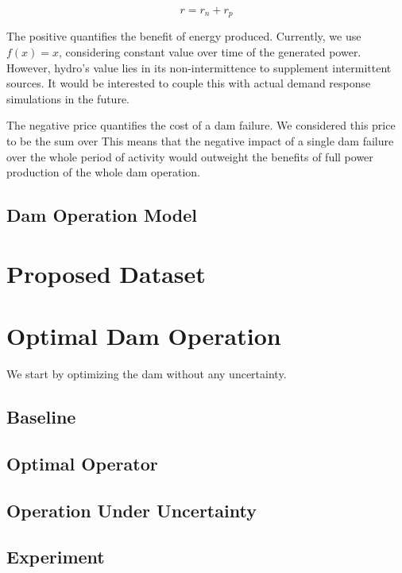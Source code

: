 \documentclass{article}
\begin{document}
$$r = r_n + r_p$$

The positive quantifies the benefit of energy produced.
Currently, we use $f(x)=x$, considering constant value over time of the generated power.
However, hydro's value lies in its non-intermittence to supplement intermittent sources.
It would be interested to couple this with actual demand response simulations in the future.

The negative price quantifies the cost of a dam failure.
We considered this price to be the sum over 
This means that the negative impact of a single dam failure over the whole period of activity 
would outweight the benefits of full power production of the whole dam operation.

\subsection{Dam Operation Model}
\label{sec: Dam Operation Model}



\section{Proposed Dataset}
\label{sec:Proposed Dataset}


\section{Optimal Dam Operation}
\label{sec:Hydrological Uncertainty}

We start by optimizing the dam without any uncertainty.

\subsection{Baseline}
\label{sec:Dam Operation baseline}

\subsection{Optimal Operator}
\label{sec:Optimal Operator}

\subsection{Operation Under Uncertainty}
\label{sec:Operation Under Uncertainty}

\subsection{Experiment}
\label{sec:Hydrological Uncertainty}
\end{document}
